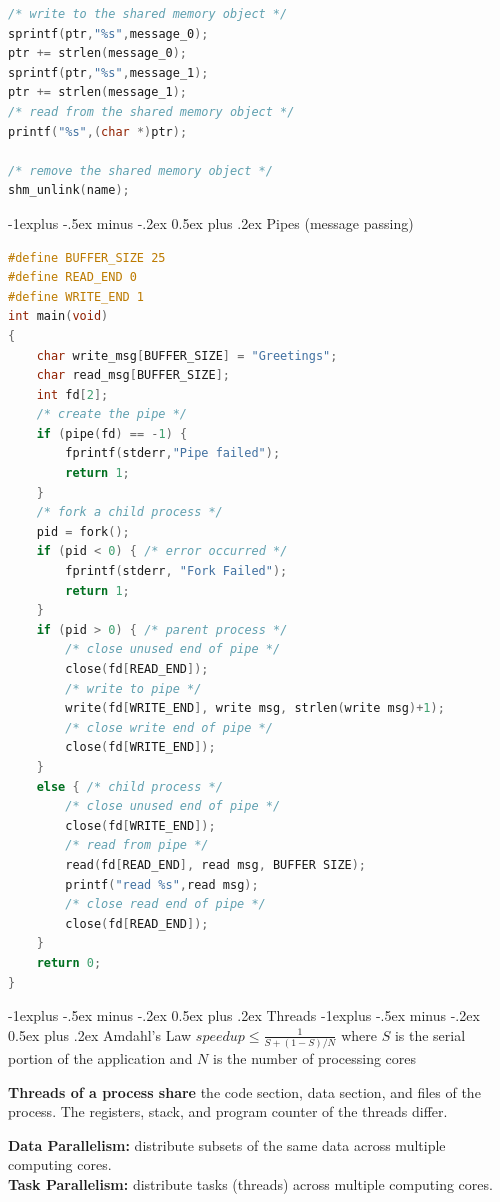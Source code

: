 \documentclass[letterpaper, 8pt]{extarticle}
\makeatletter
\renewcommand{\section}{\@startsection{section}{1}{0mm}%
                                {-1explus -.5ex minus -.2ex}%
                                {0.5ex plus .2ex}%
                                {\normalfont\normalsize\bfseries}}
\renewcommand{\subsection}{\@startsection{subsection}{2}{0mm}%
                                {-1explus -.5ex minus -.2ex}%
                                {0.5ex plus .2ex}%
                                {\normalfont\small\bfseries}}
\makeatother
\begin{document}
\begin{multicols*}{6}
\begin{lstlisting}[language=C]
/* write to the shared memory object */
sprintf(ptr,"%s",message_0);
ptr += strlen(message_0);
sprintf(ptr,"%s",message_1);
ptr += strlen(message_1);
/* read from the shared memory object */
printf("%s",(char *)ptr);

/* remove the shared memory object */
shm_unlink(name);
\end{lstlisting}

    \subsection{Pipes (message passing)}
    \begin{lstlisting}[language=C]
#define BUFFER_SIZE 25
#define READ_END 0
#define WRITE_END 1
int main(void)
{
    char write_msg[BUFFER_SIZE] = "Greetings";
    char read_msg[BUFFER_SIZE];
    int fd[2];
    /* create the pipe */
    if (pipe(fd) == -1) {
        fprintf(stderr,"Pipe failed");
        return 1;
    }
    /* fork a child process */
    pid = fork();
    if (pid < 0) { /* error occurred */
        fprintf(stderr, "Fork Failed");
        return 1;
    }
    if (pid > 0) { /* parent process */
        /* close unused end of pipe */
        close(fd[READ_END]);
        /* write to pipe */
        write(fd[WRITE_END], write msg, strlen(write msg)+1);
        /* close write end of pipe */
        close(fd[WRITE_END]);
    }
    else { /* child process */
        /* close unused end of pipe */
        close(fd[WRITE_END]);
        /* read from pipe */
        read(fd[READ_END], read msg, BUFFER SIZE);
        printf("read %s",read msg);
        /* close read end of pipe */
        close(fd[READ_END]);
    }
    return 0;
}
\end{lstlisting}
    \section{Threads}
    \subsection{Amdahl's Law}
    $speedup \leq \frac{1}{S+(1-S)/N}$ where $S$ is the serial
    portion of the application and $N$ is the number of processing cores

    \textbf{Threads of a process share} the code section, data section, and files
    of the process. The registers, stack, and program counter of the threads
    differ.

    \textbf{Data Parallelism:} distribute subsets of the same data across multiple
    computing cores. \\
    \textbf{Task Parallelism:} distribute tasks (threads) across multiple
    computing cores.


\end{multicols*}
\end{document}
